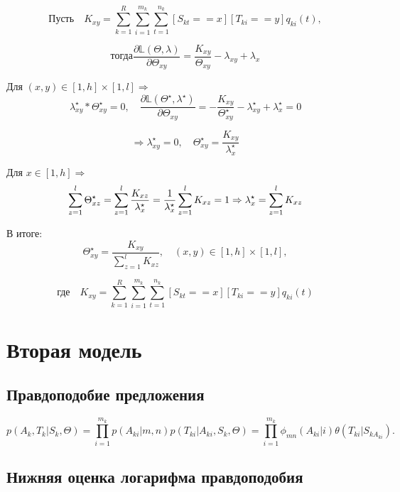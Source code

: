 \documentclass[10pt]{article}
\begin{document}
	$$ \text{Пусть}
	\quad K_{xy} =  \sum_{k=1}^R \sum_{i=1}^{m_k} \sum_{t=1}^{n_k} [S_{kt}==x][T_{ki} == y] q_{ki}(t),
	$$
	
	$$ \text{тогда}
	\frac{\partial \mathbb{L} (\Theta, \lambda)} {\partial \Theta_{xy}} =
	\frac{K_{xy}}{\Theta_{xy}} - \lambda_{xy} + \lambda_x
	$$
	
	Для $ (x, y) \in [1, h] \times [1, l] \Rightarrow $\\
	$$ \lambda_{xy}^{\star} * \Theta_{xy}^{\star} = 0, \quad
	\frac{\partial \mathbb{L} (\Theta^{\star}, \lambda^{\star})} {\partial \Theta_{xy}} =
	- \frac{K_{xy}}{\Theta_{xy}^{\star}} - \lambda_{xy}^{\star} + \lambda_{x}^{\star} = 0
	$$
	
	
	$$ \Rightarrow \lambda_{xy}^{\star} = 0, \quad \Theta_{xy}^{\star} = \frac{K_{xy}} {\lambda_{x}^{\star}}
	$$
	
	Для $ x \in [1, h] \Rightarrow $
	$$ \sum_{z=1}^{l} \Theta_{xz}^{\star} = \sum_{z=1}^{l}  \frac{K_{xz}} {\lambda_{x}^{\star}} = 
	\frac{1} {\lambda_{x}^{\star}} \sum_{z=1}^{l} K_{xz} = 1\\
	\Rightarrow \lambda_{x}^{\star} = \sum_{z=1}^{l} K_{xz}
	$$
	
	
	В итоге:  
	$$ \Theta_{xy}^{\star} = \frac{K_{xy}} {\sum_{z=1}^{l} K_{xz}}, \quad (x, y) \in [1, h] \times [1, l],
	$$
	
	$$ \text{где} \quad K_{xy} =  \sum_{k=1}^R \sum_{i=1}^{m_k} \sum_{t=1}^{n_k} [S_{kt}==x][T_{ki} == y] q_{ki}(t)
	$$
	
	\section*{Вторая модель}
	
	\subsection*{Правдоподобие предложения}
	
	$$
	p(A_k, T_k | S_k, \Theta) = \prod_{i=1}^{m_k} p(A_{ki} | m, n) p(T_{ki} | A_{ki}, S_{k}, \Theta) = \prod_{i=1}^{m_k} \phi_{mn}(A_{ki} | i) \theta(T_{ki} | S_{k{A_{ki}}}).
	$$ 
	
	\subsection*{Нижняя оценка логарифма правдоподобия}
	
\end{document}
